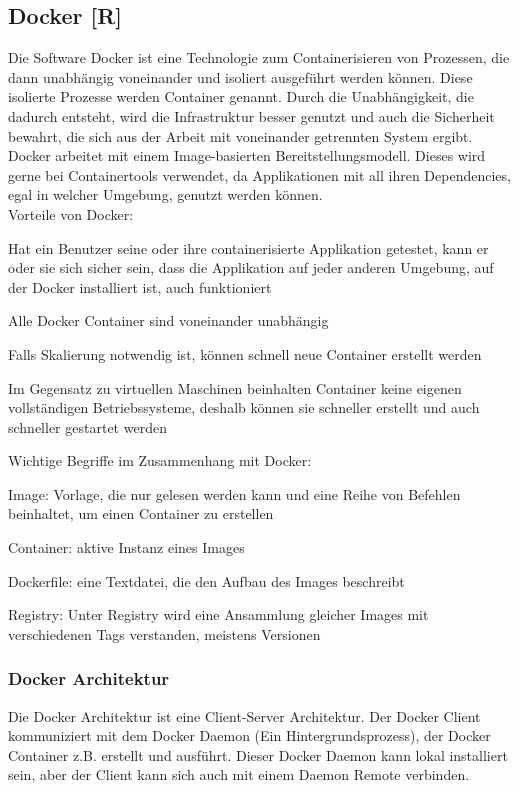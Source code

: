 \subsection{Docker [R]} \label{tech:docker}
Die Software Docker ist eine Technologie zum Containerisieren von Prozessen, die dann unabhängig voneinander und isoliert ausgeführt werden können. Diese isolierte Prozesse werden Container genannt.
Durch die Unabhängigkeit, die dadurch entsteht, wird die Infrastruktur besser genutzt und auch die Sicherheit bewahrt, die sich aus der Arbeit mit voneinander getrennten System ergibt.
Docker arbeitet mit einem Image-basierten Bereitstellungsmodell. Dieses wird gerne bei Containertools verwendet, da Applikationen mit all ihren Dependencies, egal in welcher Umgebung, genutzt werden können. \cite{docker} \\
Vorteile von Docker: \cite{docker_vorteile}
\begin{compactitem}
  \item Hat ein Benutzer seine oder ihre containerisierte Applikation getestet, kann er oder sie sich sicher sein, dass die Applikation auf jeder anderen Umgebung, auf der Docker installiert ist, auch funktioniert
  \item Alle Docker Container sind voneinander unabhängig
  \item Falls Skalierung notwendig ist, können schnell neue Container erstellt werden
  \item Im Gegensatz zu virtuellen Maschinen beinhalten Container keine eigenen vollständigen Betriebssysteme, deshalb können sie schneller erstellt und auch schneller gestartet werden
\end{compactitem}

Wichtige Begriffe im Zusammenhang mit Docker:

\begin{compactitem}
  \item Image: Vorlage, die nur gelesen werden kann und eine Reihe von Befehlen beinhaltet, um einen Container zu erstellen
  \item Container: aktive Instanz eines Images
  \item Dockerfile: eine Textdatei, die den Aufbau des Images beschreibt
  \item Registry: Unter Registry wird eine Ansammlung gleicher Images mit verschiedenen Tags verstanden, meistens Versionen
\end{compactitem}

\subsubsection{Docker Architektur}
Die Docker Architektur ist eine Client-Server Architektur. Der Docker Client kommuniziert mit dem Docker Daemon (Ein Hintergrundsprozess), der Docker Container z.B. erstellt und ausführt.
Dieser Docker Daemon kann lokal installiert sein, aber der Client kann sich auch mit einem Daemon Remote verbinden. \cite{docker_architektur}

